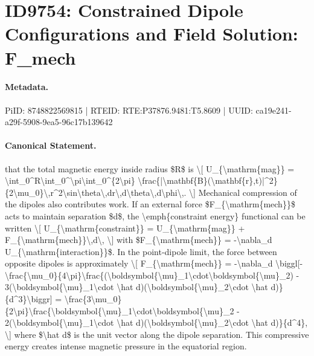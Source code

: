 \section*{ID9754: Constrained Dipole Configurations and Field Solution: F\_mech}
\paragraph{Metadata.}
PiID: 8748822569815 | RTEID: RTE:P37876.9481:T5.8609 | UUID: ca19e241-a29f-5908-9ea5-96c17b139642

\paragraph{Canonical Statement.}
that the total magnetic energy inside radius \$R\$ is \textbackslash{}[ U\_\{\textbackslash{}mathrm\{mag\}\} = \textbackslash{}int\_0\textasciicircum{}R\textbackslash{}int\_0\textasciicircum{}\textbackslash{}pi\textbackslash{}int\_0\textasciicircum{}\{2\textbackslash{}pi\} \textbackslash{}frac\{|\textbackslash{}mathbf\{B\}(\textbackslash{}mathbf\{r\},t)|\textasciicircum{}2\}\{2\textbackslash{}mu\_0\}\textbackslash{},r\textasciicircum{}2\textbackslash{}sin\textbackslash{}theta\textbackslash{},dr\textbackslash{},d\textbackslash{}theta\textbackslash{},d\textbackslash{}phi\textbackslash{},. \textbackslash{}] Mechanical compression of the dipoles also contributes work. If an external force \$F\_\{\textbackslash{}mathrm\{mech\}\}\$ acts to maintain separation \$d\$, the \textbackslash{}emph\{constraint energy\} functional can be written \textbackslash{}[ U\_\{\textbackslash{}mathrm\{constraint\}\} = U\_\{\textbackslash{}mathrm\{mag\}\} + F\_\{\textbackslash{}mathrm\{mech\}\}\textbackslash{},d\textbackslash{}, \textbackslash{}] with \$F\_\{\textbackslash{}mathrm\{mech\}\} = -\textbackslash{}nabla\_d U\_\{\textbackslash{}mathrm\{interaction\}\}\$. In the point-dipole limit, the force between opposite dipoles is approximately \textbackslash{}[ F\_\{\textbackslash{}mathrm\{mech\}\} = -\textbackslash{}nabla\_d \textbackslash{}biggl[-\textbackslash{}frac\{\textbackslash{}mu\_0\}\{4\textbackslash{}pi\}\textbackslash{}frac\{(\textbackslash{}boldsymbol\{\textbackslash{}mu\}\_1\textbackslash{}cdot\textbackslash{}boldsymbol\{\textbackslash{}mu\}\_2) - 3(\textbackslash{}boldsymbol\{\textbackslash{}mu\}\_1\textbackslash{}cdot \textbackslash{}hat d)(\textbackslash{}boldsymbol\{\textbackslash{}mu\}\_2\textbackslash{}cdot \textbackslash{}hat d)\}\{d\textasciicircum{}3\}\textbackslash{}biggr] = \textbackslash{}frac\{3\textbackslash{}mu\_0\}\{2\textbackslash{}pi\}\textbackslash{}frac\{\textbackslash{}boldsymbol\{\textbackslash{}mu\}\_1\textbackslash{}cdot\textbackslash{}boldsymbol\{\textbackslash{}mu\}\_2 - 2(\textbackslash{}boldsymbol\{\textbackslash{}mu\}\_1\textbackslash{}cdot \textbackslash{}hat d)(\textbackslash{}boldsymbol\{\textbackslash{}mu\}\_2\textbackslash{}cdot \textbackslash{}hat d)\}\{d\textasciicircum{}4\}, \textbackslash{}] where \$\textbackslash{}hat d\$ is the unit vector along the dipole separation. This compressive energy creates intense magnetic pressure in the equatorial region.

